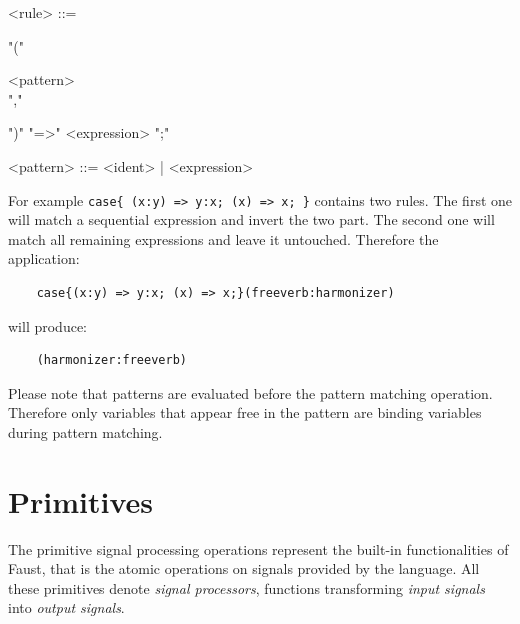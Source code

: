 \documentclass[a4paper]{book}
\begin{document}
\begin{grammar}
  <rule> ::= 
  \begin{syntdiag} 
    "("
    \begin{rep}
      <pattern> \\ ","
    \end{rep}
    ")" "=>" <expression> ";"
  \end{syntdiag}
\end{grammar}

\begin{grammar}
  <pattern> ::= 
    <ident> | <expression>
\end{grammar}


For example \lstinline'case{ (x:y) => y:x; (x) => x; }' contains two rules. The first one will match a sequential expression and invert the two part. The second one will match all remaining expressions and leave it untouched. Therefore the application:

\begin{lstlisting}
	case{(x:y) => y:x; (x) => x;}(freeverb:harmonizer)
\end{lstlisting}

will produce:

\begin{lstlisting}
	(harmonizer:freeverb)
\end{lstlisting}

Please note that patterns are evaluated before the pattern matching operation. Therefore only variables that appear free in the pattern are binding variables during pattern matching. 



\section{Primitives}
\label{primitives}
The primitive signal processing operations represent the built-in functionalities of Faust, that is the atomic operations on signals provided by the language. All these primitives denote \emph{signal processors}, functions transforming \emph{input signals} into \emph{output signals}.
\end{document}
